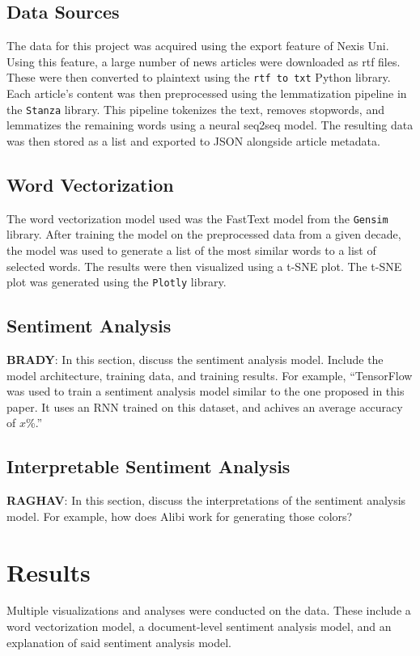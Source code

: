 \documentclass[11pt,a4paper]{article}
\begin{document}
\subsection{Data Sources}

The data for this project was acquired using the export feature of Nexis Uni. Using this feature, a large number of news articles were downloaded as rtf files. These were then converted to plaintext using the \texttt{rtf to txt} Python library. Each article's content was then preprocessed using the lemmatization pipeline in the \texttt{Stanza} library. This pipeline tokenizes the text, removes stopwords, and lemmatizes the remaining words using a neural seq2seq model. The resulting data was then stored as a list and exported to JSON alongside article metadata.

\subsection{Word Vectorization}

The word vectorization model used was the FastText model from the \texttt{Gensim} library. After training the model on the preprocessed data from a given decade, the model was used to generate a list of the most similar words to a list of selected words. The results were then visualized using a t-SNE plot. The t-SNE plot was generated using the \texttt{Plotly} library.

\subsection{Sentiment Analysis}
\textbf{BRADY}: In this section, discuss the sentiment analysis model. Include the model architecture, training data, and training results. For example, ``TensorFlow was used to train a sentiment analysis model similar to the one proposed in this paper. It uses an RNN trained on this dataset, and achives an average accuracy of $x$\%.''

\subsection{Interpretable Sentiment Analysis}
\textbf{RAGHAV}: In this section, discuss the interpretations of the sentiment analysis model. For example, how does Alibi work for generating those colors?

\section{Results}
Multiple visualizations and analyses were conducted on the data. These include a word vectorization model, a document-level sentiment analysis model, and an explanation of said sentiment analysis model.
\end{document}

